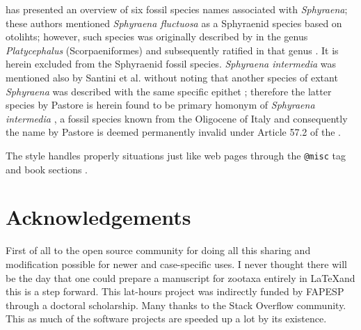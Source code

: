 \documentclass{article}
\begin{document}
\citet{Santini2015} has presented an overview of six fossil species names associated with \textit{Sphyraena}; these authors mentioned \textit{Sphyraena fluctuosa} as a Sphyraenid species based on otolihts; however, such species was originally described by \citet{Nolf1972} in the genus \textit{Platycephalus} (Scorpaeniformes) and subsequently ratified in that genus \citep[e.g.,][]{Huyghebaert1979}. It is herein excluded from the Sphyraenid fossil species. \textit{Sphyraena intermedia} \citealp{Bassani1889} was mentioned also by Santini et al. without noting that another species of extant \textit{Sphyraena} was described with the same specific epithet \citep{Pastore2009}; therefore the latter species by Pastore is herein found to be primary homonym of \textit{Sphyraena intermedia} \citep{Bassani1889}, a fossil species known from the Oligocene of Italy and consequently the name by Pastore is deemed permanently invalid under Article 57.2 of the \citet{ICZN1999}.

The style handles properly situations just like web pages through the \texttt{@misc} tag \citep[e.g., ][]{EschmeyerWeb} and book sections \citep{Switchenska1968,Bohm1924}.

\section{Acknowledgements}

First of all to the open source community for doing all this sharing and modification possible for newer and case-specific uses. I never thought there will be the day that one could prepare a manuscript for zootaxa entirely in \LaTeX and this is a step forward. This lat-hours project was indirectly funded by FAPESP through a doctoral scholarship. Many thanks to the Stack Overflow community. This as much of the software projects are speeded up a lot by its existence.



\end{document}
